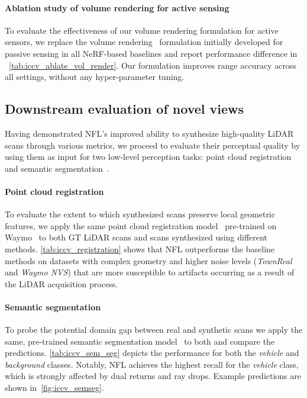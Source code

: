 \paragraph{Ablation study of volume rendering for active sensing}
To evaluate the effectiveness of our volume rendering formulation for active sensors, we replace the volume rendering~\cite{mildenhall2020nerf} formulation initially developed for passive sensing in all NeRF-based baselines and report performance difference in ~\cref{tab:iccv_ablate_vol_render}. Our formulation improves range accuracy across all settings, without any hyper-parameter tuning.







\subsection{Downstream evaluation of novel views}
\label{sec:perceptual_quality} 
Having demonstrated NFL's improved ability to synthesize high-quality LiDAR scans through various metrics, we proceed to evaluate their perceptual quality by using them as input for two low-level perception tasks: point cloud registration~\cite{huang2021predator} and semantic segmentation~\cite{tang2020searching}.


\paragraph{Point cloud registration}
To evaluate the extent to which synthesized scans preserve local geometric features, we apply the same point cloud registration model~\cite{huang2022dynamic} pre-trained on Waymo~\cite{sun2020scalability} to both GT LiDAR scans and scans synthesized using different methods. \cref{tab:iccv_registration} shows that NFL outperforms the baseline methods on datasets with complex geometry and higher noise levels (\textit{TownReal} and \textit{Waymo NVS}) that are more susceptible to artifacts occurring as a result of the LiDAR acquisition process.





\paragraph{Semantic segmentation}
To probe the potential domain gap between real and synthetic scans we apply the same, pre-trained semantic segmentation model~\cite{tang2020searching} to both and compare the predictions. \cref{tab:iccv_sem_seg} depicts the performance for both the \textit{vehicle} and \textit{background} classes. Notably, NFL achieves the highest recall for the \textit{vehicle} class, which is strongly affected by dual returns and ray drops. Example predictions are shown in~\cref{fig:iccv_semseg}.
